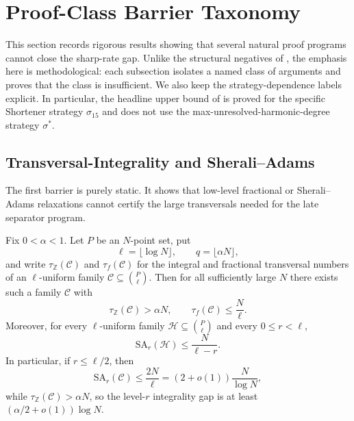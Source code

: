 \section{Proof-Class Barrier Taxonomy}\label{sec:proof-class-barriers}

This section records rigorous results showing that several natural proof
programs cannot close the sharp-rate gap.  Unlike the structural negatives of
, the emphasis here is methodological: each
subsection isolates a named class of arguments and proves that the class is
insufficient.  We also keep the strategy-dependence labels explicit.  In
particular, the headline upper bound of  is proved
for the specific Shortener strategy $\sigma_{15}$ and does not use the
max-unresolved-harmonic-degree strategy $\sigma^*$.

\subsection{Transversal-Integrality and Sherali--Adams}

The first barrier is purely static.  It shows that low-level fractional or
Sherali--Adams relaxations cannot certify the large transversals needed for the
late separator program.

\begin{theorem}\label{thm:sa-barrier}
Fix $0<\alpha<1$.  Let $P$ be an $N$-point set, put
\[
\ell=\lfloor \log N\rfloor,
\qquad
q=\lfloor \alpha N\rfloor,
\]
and write $\tau_{\mathbb Z}(\mathcal C)$ and $\tau_f(\mathcal C)$ for the
integral and fractional transversal numbers of an $\ell$-uniform family
$\mathcal C\subseteq \binom{P}{\ell}$.  Then for all sufficiently large $N$
there exists such a family $\mathcal C$ with
\[
\tau_{\mathbb Z}(\mathcal C)> \alpha N,
\qquad
\tau_f(\mathcal C)\le \frac{N}{\ell}.
\]
Moreover, for every $\ell$-uniform family $\mathcal H\subseteq \binom{P}{\ell}$
and every $0\le r<\ell$,
\[
\mathrm{SA}_r(\mathcal H)\le \frac{N}{\ell-r}.
\]
In particular, if $r\le \ell/2$, then
\[
\mathrm{SA}_r(\mathcal C)\le \frac{2N}{\ell}=(2+o(1))\frac{N}{\log N},
\]
while $\tau_{\mathbb Z}(\mathcal C)>\alpha N$, so the level-$r$ integrality
gap is at least $(\alpha/2+o(1))\log N$.
\end{theorem}

